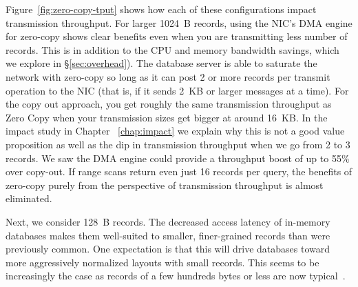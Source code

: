 
Figure~\ref{fig:zero-copy-tput} shows how each of these configurations impact
transmission throughput. For larger 1024~B records, using the NIC's DMA engine
for zero-copy shows clear benefits even when you are transmitting less number of 
records. This is in addition to the CPU and memory bandwidth savings, which 
we explore in \S\ref{sec:overhead}). The database server is able
to saturate the network with zero-copy so long as it can post 2 or more
records per transmit operation to the NIC (that is, if it sends 2~KB or larger
messages at a time). For the copy out approach, you get roughly the same transmission 
throughput as Zero Copy when your transmission sizes get bigger at around 16~KB. In 
the impact study in Chapter ~\ref{chap:impact} we explain why this is not a good value 
proposition as well as the dip in transmission throughput when we go from 2 to 3 records.
We saw the DMA engine could provide a throughput boost
of up to 55\% over copy-out. If range scans return even just 16 records per query, the
benefits of zero-copy purely from the perspective of transmission throughput is almost eliminated.

Next, we consider 128~B records. The decreased access latency of
in-memory databases makes them well-suited to smaller, finer-grained records
than were previously common. One expectation is that this will drive databases
toward more aggressively normalized layouts with small records. This
seems to be increasingly the case as records of a few hundreds bytes or less
are now typical~\cite{fb-memcache,fb-workload}.

